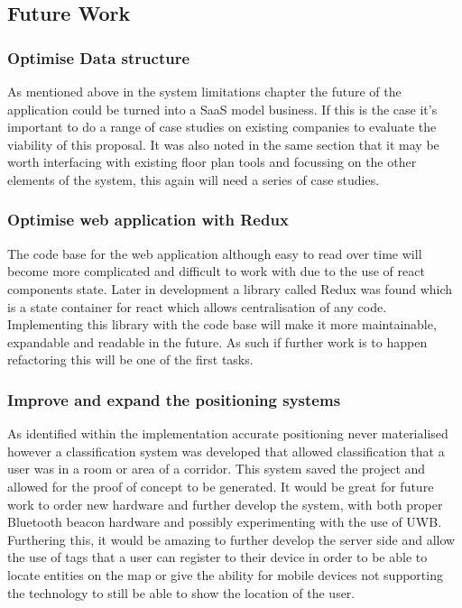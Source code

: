 \subsection{Future Work}
\subsubsection{Optimise Data structure}
As mentioned above in the system limitations chapter the future of the application could be turned into a SaaS model business. If this is the case it's important to do a range of case studies on existing companies to evaluate the viability of this proposal. It was also noted in the same section that it may be worth interfacing with existing floor plan tools and focussing on the other elements of the system, this again will need a series of case studies.
\subsubsection{Optimise web application with Redux}
The code base for the web application although easy to read over time will become more complicated and difficult to work with due to the use of react components state. Later in development a library called Redux was found which is a state container for react which allows centralisation of any code. Implementing this library with the code base will make it more maintainable, expandable and readable in the future. As such if further work is to happen refactoring this will be one of the first tasks.

\subsubsection{Improve and expand the positioning systems}
As identified within the implementation accurate positioning never materialised however a classification system was developed that allowed classification that a user was in a room or area of a corridor. This system saved the project and allowed for the proof of concept to be generated. It would be great for future work to order new hardware and further develop the system, with both proper Bluetooth beacon hardware and possibly experimenting with the use of UWB. Furthering this, it would be amazing to further develop the server side and allow the use of tags that a user can register to their device in order to be able to locate entities on the map or give the ability for mobile devices not supporting the technology to still be able to show the location of the user.


